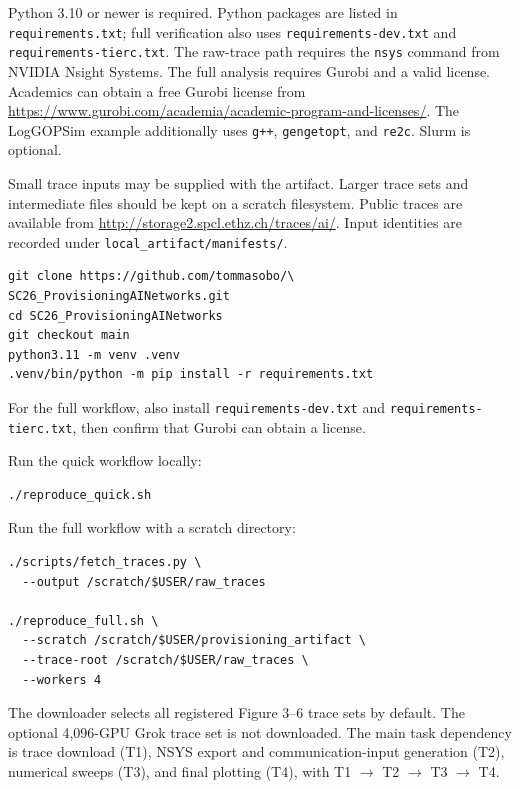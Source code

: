 \documentclass[conference]{IEEEtran}
\begin{document}

Python 3.10 or newer is required. Python packages are listed in
\texttt{requirements.txt}; full verification also uses
\texttt{requirements-dev.txt} and \texttt{requirements-tierc.txt}.
The raw-trace path requires the \texttt{nsys} command from NVIDIA
Nsight Systems. The full analysis requires Gurobi and a valid license.
Academics can obtain a
free Gurobi license from
\url{https://www.gurobi.com/academia/academic-program-and-licenses/}.
The LogGOPSim example additionally uses \texttt{g++}, \texttt{gengetopt},
and \texttt{re2c}. Slurm is optional.


Small trace inputs may be supplied with the artifact. Larger trace sets and
intermediate files should be kept on a scratch filesystem. Public traces are
available from \url{http://storage2.spcl.ethz.ch/traces/ai/}.
Input identities are recorded under \texttt{local\_artifact/manifests/}.


\begin{verbatim}
git clone https://github.com/tommasobo/\
SC26_ProvisioningAINetworks.git
cd SC26_ProvisioningAINetworks
git checkout main
python3.11 -m venv .venv
.venv/bin/python -m pip install -r requirements.txt
\end{verbatim}

For the full workflow, also install \texttt{requirements-dev.txt} and
\texttt{requirements-tierc.txt}, then confirm that Gurobi can obtain a
license.

\artcomp

Run the quick workflow locally:

\begin{verbatim}
./reproduce_quick.sh
\end{verbatim}

Run the full workflow with a scratch directory:

\begin{verbatim}
./scripts/fetch_traces.py \
  --output /scratch/$USER/raw_traces

./reproduce_full.sh \
  --scratch /scratch/$USER/provisioning_artifact \
  --trace-root /scratch/$USER/raw_traces \
  --workers 4
\end{verbatim}

The downloader selects all registered Figure 3--6 trace sets by default.
The optional 4,096-GPU Grok trace set is not downloaded.
The main task dependency is trace download (T1), NSYS export and
communication-input generation (T2), numerical sweeps (T3), and final
plotting (T4), with T1 $\rightarrow$ T2 $\rightarrow$ T3 $\rightarrow$ T4.
\end{document}

